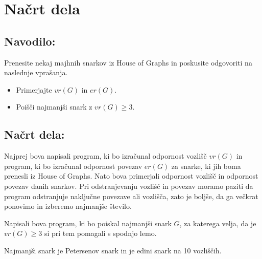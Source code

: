 \documentclass[a4paper, 10pt]{article}
\begin{document}
\section{Načrt dela}

\subsection*{Navodilo:}
Prenesite nekaj majhnih snarkov iz House of Graphs in
poskusite odgovoriti na naslednje vprašanja.
\begin{itemize}
    \item Primerjajte $vr(G)$ in $er(G)$.
    \item Poišči najmanjši snark z $vr(G) \ge 3$.
\end{itemize}

\subsection*{Načrt dela:}
Najprej bova napisali program, ki bo izračunal odpornost vozlišč $vr(G)$ in program, ki bo 
izračunal odpornost povezav $er(G)$ za snarke, ki jih boma prenesli iz House of Graphs.
Nato bova primerjali odpornost vozlišč in odpornost povezav danih snarkov. Pri odstranjevanju
vozlišč in povezav moramo paziti da program odstranjuje naključne povezave ali vozlišča, zato 
je boljše, da ga večkrat ponovimo in izberemo najmanjše število.

Napisali bova program, ki bo poiskal najmanjši snark $G$, za katerega velja, da je $vr(G) \ge 3$ 
si pri tem pomagali s spodnjo lemo.
\begin{lemma}
    Najmanjši snark je Petersenov snark in je edini snark na 10 vozliščih.
\end{lemma}
\end{document}
